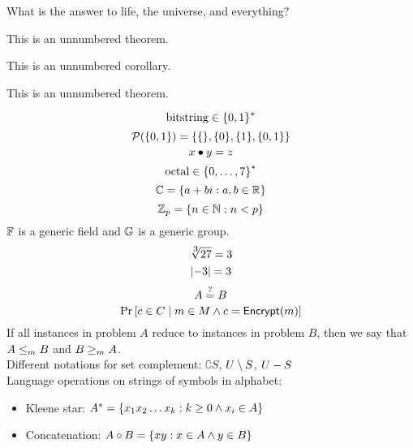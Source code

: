\documentclass{article}
\begin{document}
\begin{problem}
    What is the answer to life, the universe, and everything?
\end{problem}
\begin{solution}
    \begin{theorem*}
        This is an unnumbered theorem.
    \end{theorem*}
    \begin{corollary*}
        This is an unnumbered corollary.
    \end{corollary*}
    \begin{lemma*}
        This is an unnumbered theorem.
    \end{lemma*}
    $$\str{bitstring} \in \bitset$$
    $$\powerset{\set{0,1}} = \set{\set{}, \set{0}, \set{1}, \set{0,1}}$$
    $$x \bullet y = z$$
    $$\str{octal} \in \lset{0}{7}^*$$
    $$\C = \cset{a + bi}{a,b \in \R}$$
    $$\Zmod{p} = \cset{n \in \N}{n < p}$$
    $\F$ is a generic field and $\G$ is a generic group.\\
    $$\nthroot{3}{27} = 3$$
    $$\abs{-3} = 3$$
    $$ A \stackrel{?}{=} B$$
    $$\Pr{c \in C \given m \in M \land c = \algoname{Encrypt}(m) }$$
    If all instances in problem $A$ reduce to instances in problem $B$, then we say that $A \leq_m B$ and $B \geq_m A$.\\
    Different notations for set complement: $\complement{S}$, $\setcomplement{U}{S}$, $\minuscomplement{U}{S}$\\
    Language operations on strings of symbols in alphabet:
    \begin{itemize}
        \item Kleene star: $\kleenestar{A} = \cset{x_1 x_2 \ldots x_k}{k \geq 0 \land x_i \in A}$
        \item Concatenation: $\concat{A}{B} = \cset{xy}{x \in A \land y \in B}$
    \end{itemize}
\end{solution}
\end{document}
